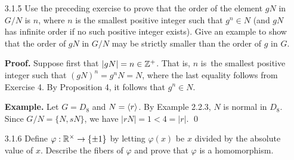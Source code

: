 \begin{enumerate}
      \textbf{Proof.} Proceed by induction on $\alpha$. The statement is clearly
      true for $\alpha = 1$, so suppose $(gN)^k = g^kN$ for some positive
      integer $k$. So
      \begin{align*}
         (gN)^{k+1} &= (gN)^kgN &[\text{Exercise 1.1.19}] \\
            &= g^kNgN &[\text{Inductive Hypothesis}] \\
            &= (g^kg)N \\
            &= g^{k+1}N. &[\text{Exercise 1.1.19}]
      \end{align*}
      Thus our statement holds for all positive integer $\alpha$. For a postive
      integer $n$, we have that
      \begin{align*}
         (gN)^{-n} &= ((gN)^{-1})^n &[\text{Definition}] \\
            &= (g^{-1}N)^n &[\text{Proposition 5}] \\
            &= (g^{-1})^nN &[\text{From Inductive Proof Above}] \\
            &= g^{-n}N. &[\text{Definition}] 
      \end{align*}
      Finally $(gN)^0 = 1 = N = 1N = g^0N$, so that our statement holds for each
      integer $\alpha$. \qed
   \item[3.1.5]   Use the preceding exercise to prove that the order of the
                  element $gN$ in $G/N$ is $n$, where $n$ is the smallest
                  positive integer such that $g^n \in N$ (and $gN$ has infinite
                  order if no such positive integer exists). Give an example to
                  show that the order of $gN$ in $G/N$ may be strictly smaller
                  than the order of $g$ in $G$.

      \textbf{Proof.} Suppose first that $|gN| = n \in \mathbb{Z}^+$. That is, $n$ is\
      the smallest positive integer such that $(gN)^n = g^nN = N$, where the
      last equality follows from Exercise 4. By Proposition 4, it follows that
      $g^n \in N$.

      \textbf{Example.} Let $G = D_8$ and $N = \langle r \rangle$. By Example 2.2.3, $N$
      is normal in $D_8$. Since $G/N = \{N, sN\}$, we have $|rN| = 1 < 4 = |r|$. 
      \qed
   \item[3.1.6]   Define $\varphi : \mathbb{R}^\times \rightarrow \{\pm1\}$ by letting
                  $\varphi(x)$ be $x$ divided by the absolute value of $x$.
                  Describe the fibers of $\varphi$ and prove that $\varphi$ is a
                  homomorphism.
   

\end{enumerate}
